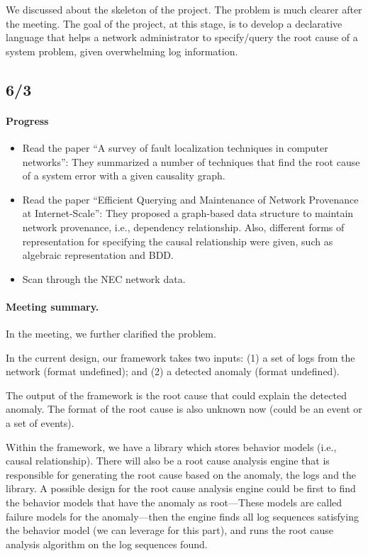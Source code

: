 \documentclass{article}
\begin{document}
We discussed about the skeleton of the project. The problem is much clearer
after the meeting. The goal of the project, at this stage, is to develop a
declarative language that helps a network administrator to specify/query the root cause of a
system problem, given overwhelming log information.

\subsection{6/3}
\label{sec:meeting:63}

\paragraph{Progress}
\begin{itemize}
\item Read the paper ``A survey of fault localization techniques in computer
networks'': They summarized a number of techniques that find the root cause of a
system error with a given causality graph. 

\item Read the paper ``Efficient Querying and Maintenance of Network Provenance at
Internet-Scale'': They proposed a graph-based data structure to maintain network
provenance, i.e., dependency relationship. Also, different forms of
representation for specifying the causal relationship were given, such as
algebraic representation and BDD.

\item Scan through the NEC network data.
\end{itemize}

\paragraph{Meeting summary.}
In the meeting, we further clarified the problem.

In the current design, our framework takes two inputs:
(1) a set of logs from the network (format undefined); and
(2) a detected anomaly (format undefined).

The output of the framework is the root cause that could explain the detected
anomaly. The format of the root cause is also unknown now (could be an event or
a set of events). 

Within the framework, we have a library which stores behavior
models (i.e., causal relationship). There will also be a root cause analysis
engine that is responsible
for generating the root cause based on the anomaly, the logs and the
library. A possible design for the root cause analysis engine
could be first to find the behavior models that have the anomaly as root---These
models are called failure models for the anomaly---then the
engine finds all log sequences satisfying the behavior model (we can
leverage \saf{} for this part), and runs the root cause analysis algorithm on
the log sequences found. 
\end{document}

